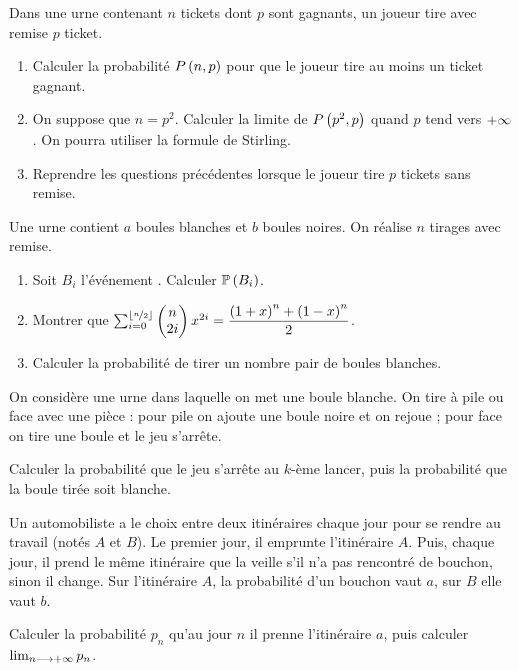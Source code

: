 \begin{exo}
Dans une urne contenant \(n\) tickets dont \(p\) sont gagnants, un joueur tire avec remise \(p\) ticket.

\begin{enumerate}
    \item Calculer la probabilité \(P\paren{n,p}\) pour que le joueur tire au moins un ticket gagnant. \\
    \item On suppose que \(n=p^2\). Calculer la limite de \(P\paren{p^2,p}\) quand \(p\) tend vers \(\pinf\). On pourra utiliser la formule de Stirling. \\
    \item Reprendre les questions précédentes lorsque le joueur tire \(p\) tickets sans remise.
\end{enumerate}
\end{exo}

\begin{exo}
Une urne contient \(a\) boules blanches et \(b\) boules noires. On réalise \(n\) tirages avec remise.

\begin{enumerate}
    \item Soit \(B_i\) l'événement . Calculer \(\proba{B_i}\). \\
    \item Montrer que \(\sum_{i=0}^{\floor{\nicefrac{n}{2}}}\binom{2i}{n}x^{2i}=\dfrac{\paren{1+x}^n+\paren{1-x}^n}{2}\). \\
    \item Calculer la probabilité de tirer un nombre pair de boules blanches.
\end{enumerate}
\end{exo}

\begin{exo}
On considère une urne dans laquelle on met une boule blanche. On tire à pile ou face avec une pièce : pour pile on ajoute une boule noire et on rejoue ; pour face on tire une boule et le jeu s'arrête.

Calculer la probabilité que le jeu s'arrête au \(k\)-ème lancer, puis la probabilité que la boule tirée soit blanche.
\end{exo}

\begin{exo}
Un automobiliste a le choix entre deux itinéraires chaque jour pour se rendre au travail (notés \(A\) et \(B\)). Le premier jour, il emprunte l'itinéraire \(A\). Puis, chaque jour, il prend le même itinéraire que la veille s'il n'a pas rencontré de bouchon, sinon il change. Sur l'itinéraire \(A\), la probabilité d'un bouchon vaut \(a\), sur \(B\) elle vaut \(b\).

Calculer la probabilité \(p_n\) qu'au jour \(n\) il prenne l'itinéraire \(a\), puis calculer \(\lim_{n\to\pinf}p_n\).
\end{exo}

